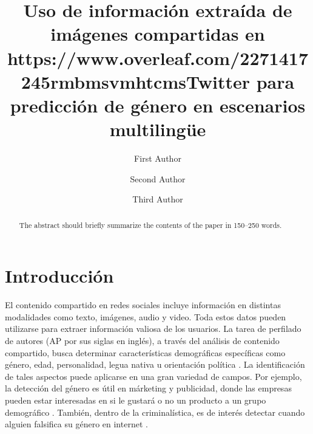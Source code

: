 \documentclass[runningheads]{llncs}
\begin{document}
%
\title{Uso de información extraída de imágenes compartidas en https://www.overleaf.com/2271417245rmbmsvmhtcmsTwitter para predicción de género en escenarios multilingüe}


\author{First Author \and
Second Author \and
Third Author}
%
%

\maketitle

\begin{abstract}
The abstract should briefly summarize the contents of the paper in
150--250 words.

\end{abstract}

\section{Introducción}

El contenido compartido en redes sociales incluye información 
en distintas modalidades como texto, imágenes, audio y video.
Toda estos datos pueden utilizarse para extraer información
valiosa de los usuarios. 
La tarea de perfilado de autores (AP por sus siglas en inglés), a través
del análisis de contenido compartido, busca determinar características demográficas 
específicas como género, edad, personalidad, legua nativa u orientación 
política \cite{rangel_rosso_montes-y-gomez_potthast_stein}. La identificación de tales 
aspectos puede aplicarse en una gran variedad de campos. Por ejemplo, la detección del 
género es útil en márketing y publicidad, donde las empresas pueden estar interesadas
en si le gustará o no un producto a un grupo demográfico \cite{miller_dickinson_hu_2012}.
También, dentro de la criminalística, es de interés detectar cuando alguien falsifica su género en internet \cite{cheng_chandramouli_subbalakshmi_2011}. 
\end{document}
